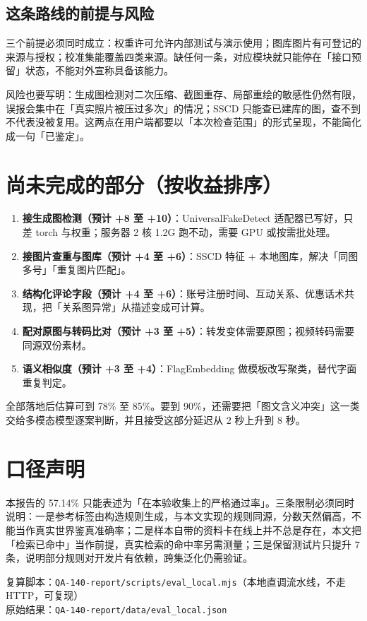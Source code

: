 \documentclass[11pt]{ctexart}
\begin{document}
\subsection{这条路线的前提与风险}

三个前提必须同时成立：权重许可允许内部测试与演示使用；图库图片有可登记的来源与授权；校准集能覆盖四类来源。缺任何一条，对应模块就只能停在「接口预留」状态，不能对外宣称具备该能力。

风险也要写明：生成图检测对二次压缩、截图重存、局部重绘的敏感性仍然有限，误报会集中在「真实照片被压过多次」的情况；SSCD 只能查已建库的图，查不到不代表没被复用。这两点在用户端都要以「本次检查范围」的形式呈现，不能简化成一句「已鉴定」。

\section{尚未完成的部分（按收益排序）}

\begin{enumerate}
\item \textbf{接生成图检测（预计 +8 至 +10）}：UniversalFakeDetect 适配器已写好，只差 torch 与权重；服务器 2 核 1.2G 跑不动，需要 GPU 或按需批处理。
\item \textbf{接图片查重与图库（预计 +4 至 +6）}：SSCD 特征 + 本地图库，解决「同图多号」「重复图片匹配」。
\item \textbf{结构化评论字段（预计 +4 至 +6）}：账号注册时间、互动关系、优惠话术共现，把「关系图异常」从描述变成可计算。
\item \textbf{配对原图与转码比对（预计 +3 至 +5）}：转发变体需要原图；视频转码需要同源双份素材。
\item \textbf{语义相似度（预计 +3 至 +4）}：FlagEmbedding 做模板改写聚类，替代字面重复判定。
\end{enumerate}

全部落地后估算可到 78\% 至 85\%。要到 90\%，还需要把「图文含义冲突」这一类交给多模态模型逐案判断，并且接受这部分延迟从 2 秒上升到 8 秒。

\section{口径声明}

本报告的 57.14\% 只能表述为「在本验收集上的严格通过率」。三条限制必须同时说明：一是参考标签由构造规则生成，与本文实现的规则同源，分数天然偏高，不能当作真实世界鉴真准确率；二是样本自带的资料卡在线上并不总是存在，本文把「检索已命中」当作前提，真实检索的命中率另需测量；三是保留测试片只提升 7 条，说明部分规则对开发片有依赖，跨集泛化仍需验证。

\vspace{0.6em}
\noindent\small 复算脚本：\texttt{QA-140-report/scripts/eval\_local.mjs}（本地直调流水线，不走 HTTP，可复现）\\
原始结果：\texttt{QA-140-report/data/eval\_local.json}
\end{document}
